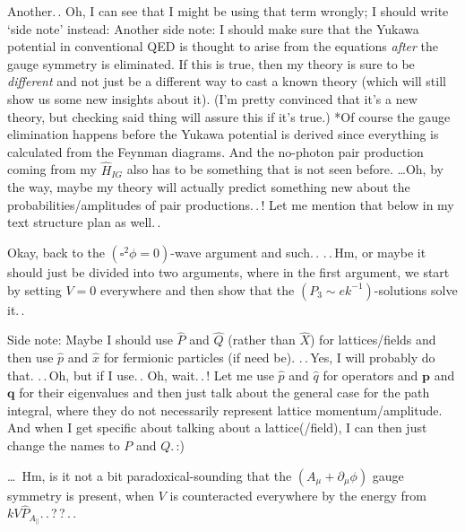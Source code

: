 \documentclass{report}
\begin{document}
Another.\,. Oh, I can see that I might be using that term wrongly; I should write `side note' instead: Another side note: I should make sure that the Yukawa potential in conventional QED is thought to arise from the equations \emph{after} the gauge symmetry is eliminated. If this is true, then my theory is sure to be \emph{different} and not just be a different way to cast a known theory (which will still show us some new insights about it). (I'm pretty convinced that it's a new theory, but checking said thing will assure this if it's true.) *Of course the gauge elimination happens before the Yukawa potential is derived since everything is calculated from the Feynman diagrams. And the no-photon pair production coming from my $\hat H_{IG}$ also has to be something that is not seen before. \ldots Oh, by the way, maybe my theory will actually predict something new about the probabilities/amplitudes of pair productions.\,.\,! Let me mention that below in my text structure plan as well.\,.

Okay, back to the $(\square^2\phi = 0)$-wave argument and such.\,. .\,.\,Hm, or maybe it should just be divided into two arguments, where in the first argument, we start by setting $V=0$ everywhere and then show that the $(P_3 \sim e k^{-1})$-solutions solve it.\,. 

Side note: Maybe I should use $\hat P$ and $\hat Q$ (rather than $\hat X$) for lattices/fields and then use $\hat p$ and $\hat x$ for fermionic particles (if need be). .\,.\,Yes, I will probably do that. .\,.\,Oh, but if I use.\,. Oh, wait.\,.\,! Let me use $\hat p$ and $\hat q$ for operators and $\boldsymbol{p}$ and $\boldsymbol{q}$ for their eigenvalues and then just talk about the general case for the path integral, where they do not necessarily represent lattice momentum/amplitude. And when I get specific about talking about a lattice(/field), I can then just change the names to $P$ and $Q$.\,:) 

\ldots\ Hm, is it not a bit paradoxical-sounding that the $(A_\mu + \partial_\mu \phi)$ gauge symmetry is present, when $V$ is counteracted everywhere by the energy from $k V \hat P_{A_\parallel}$.\,.\,?\,?\,.\,.
\end{document}
